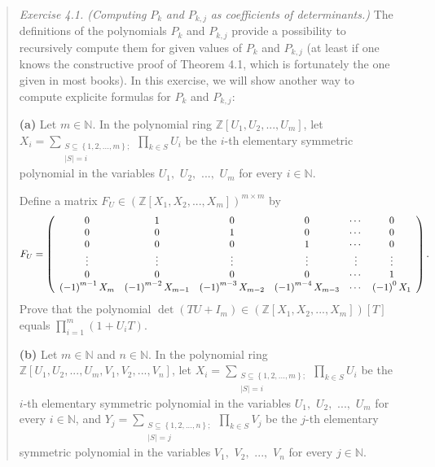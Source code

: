 \documentclass[12pt,final,notitlepage,onecolumn,german]{article}%
\begin{document}
\begin{quotation}
\textit{Exercise 4.1. (Computing }$P_{k}$ \textit{and }$P_{k,j}$ \textit{as
coefficients of determinants.)} The definitions of the polynomials $P_{k}$ and
$P_{k,j}$ provide a possibility to recursively compute them for given values
of $P_{k}$ and $P_{k,j}$ (at least if one knows the constructive proof of
Theorem 4.1, which is fortunately the one given in most books). In this
exercise, we will show another way to compute explicite formulas for $P_{k}$
and $P_{k,j}$:

\textbf{(a)} Let $m\in\mathbb{N}$. In the polynomial ring $\mathbb{Z}\left[
U_{1},U_{2},...,U_{m}\right]  $, let $X_{i}=\sum\limits_{\substack{S\subseteq
\left\{  1,2,...,m\right\}  ;\\\left\vert S\right\vert =i}}\prod\limits_{k\in
S}U_{i}$ be the $i$-th elementary symmetric polynomial in the variables
$U_{1},$ $U_{2},$ $...,$ $U_{m}$ for every $i\in\mathbb{N}$.

Define a matrix $F_{U}\in\left(  \mathbb{Z}\left[  X_{1},X_{2},...,X_{m}%
\right]  \right)  ^{m\times m}$ by%
\[
F_{U}=\left(
\begin{array}
[c]{cccccc}%
0 & 1 & 0 & 0 & \cdots & 0\\
0 & 0 & 1 & 0 & \cdots & 0\\
0 & 0 & 0 & 1 & \cdots & 0\\
\vdots & \vdots & \vdots & \vdots & \vdots & \vdots\\
0 & 0 & 0 & 0 & \cdots & 1\\
\left(  -1\right)  ^{m-1}X_{m} & \left(  -1\right)  ^{m-2}X_{m-1} & \left(
-1\right)  ^{m-3}X_{m-2} & \left(  -1\right)  ^{m-4}X_{m-3} & \cdots & \left(
-1\right)  ^{0}X_{1}%
\end{array}
\right)  .
\]
Prove that the polynomial $\det\left(  TU+I_{m}\right)  \in\left(
\mathbb{Z}\left[  X_{1},X_{2},...,X_{m}\right]  \right)  \left[  T\right]  $
equals $\prod\limits_{i=1}^{m}\left(  1+U_{i}T\right)  $.

\textbf{(b)} Let $m\in\mathbb{N}$ and $n\in\mathbb{N}$. In the polynomial ring
$\mathbb{Z}\left[  U_{1},U_{2},...,U_{m},V_{1},V_{2},...,V_{n}\right]  $, let
$X_{i}=\sum\limits_{\substack{S\subseteq\left\{  1,2,...,m\right\}
;\\\left\vert S\right\vert =i}}\prod\limits_{k\in S}U_{i}$ be the $i$-th
elementary symmetric polynomial in the variables $U_{1},$ $U_{2},$ $...,$
$U_{m}$ for every $i\in\mathbb{N}$, and $Y_{j}=\sum
\limits_{\substack{S\subseteq\left\{  1,2,...,n\right\}  ;\\\left\vert
S\right\vert =j}}\prod\limits_{k\in S}V_{j}$ be the $j$-th elementary
symmetric polynomial in the variables $V_{1},$ $V_{2},$ $...,$ $V_{n}$ for
every $j\in\mathbb{N}$.


\end{quotation}
\end{document}
